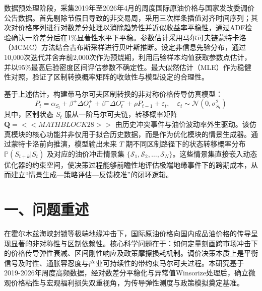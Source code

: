 \documentclass{mcmthesis}
\begin{document}
数据预处理阶段，采集2019年至2026年4月的周度国际原油价格与国家发改委调价公告数据。首先剔除节假日导致的非交易周，采用三次样条插值对齐时间序列；其次对价格序列进行对数差分处理以消除趋势性并近似收益率平稳性，通过ADF检验确认一阶差分后在1\%显著性水平下平稳。参数估计采用马尔可夫链蒙特卡洛（MCMC）方法结合吉布斯采样进行贝叶斯推断。设定非信息先验分布，通过10,000次迭代并舍弃前2,000次作为预烧期，利用后验样本均值获取参数点估计，并以95\%最高后验密度区间评估参数不确定性。最大似然估计（MLE）作为稳健性对照，验证了区制转换概率矩阵的收敛性与模型设定的合理性。

基于上述估计，构建带马尔可夫区制转换的非对称价格传导仿真模型：
$$P_t = \alpha_{S_t} + \beta^+ \Delta O_t^+ + \beta^- \Delta O_t^- + \rho P_{t-1} + \varepsilon_t, \quad \varepsilon_t \sim \mathcal{N}(0, \sigma_{S_t}^2) \tag{1}$$
其中，区制状态 $S_t$ 服从一阶马尔可夫链，转移概率矩阵 $\mathbf{Q} = <<MATHBLOCK28>>$ 由历史冲突事件与油价波动率外生驱动。该仿真模块的核心功能并非仅用于拟合历史数据，而是作为优化模块的情景生成器。通过蒙特卡洛前向推演，模型输出未来 $T$ 期不同区制路径下的状态转移概率分布 $\mathbb{P}(S_{t+k} | S_t)$ 及对应的油价冲击情景集 $\{\mathcal{S}_1, \mathcal{S}_2, \dots, \mathcal{S}_N\}$。这些情景集直接嵌入动态优化器的约束空间，使决策过程能够前瞻性地评估极端地缘事件下的跨期成本，从而建立“情景生成—策略评估—反馈校准”的闭环逻辑。


\section{ 一、问题重述}

在霍尔木兹海峡封锁等极端地缘冲击下，国际原油价格向国内成品油价格的传导呈现显著的非对称性与区制依赖性。核心科学问题在于：如何定量刻画跨市场冲击下的价格传导弹性衰减、区间刚性响应及政策摩擦损耗机制。调价决策本质上是平衡信号及时性、通胀容忍度与产业可持续性的带约束马尔可夫过程。本研究基于2019-2026年周度高频数据，经对数差分平稳化与异常值Winsorize处理后，确立微观价格粘性与宏观福利损失双重视角，为传导弹性测度与政策模拟奠定基准。
\end{document}
